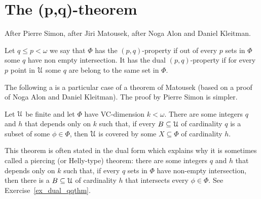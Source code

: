 \documentclass[sputnik.tex]{subfiles}
\begin{document}
\def\vc{{\footnotesize VC}}
\def\nip{{\footnotesize NIP}}


\def\medrel#1{\parbox[t]{6ex}{$\displaystyle\hfil #1$}}
\def\ceq#1#2#3{\parbox[t]{25ex}{$\displaystyle #1$}\medrel{#2}{$\displaystyle #3$}}

\def\mr{\color{brown}}
\def\gr{\color{green}}


\chapter{The (p,q)-theorem}\label{qq}

After Pierre Simon, after Jiri Matousek, after Noga Alon and Daniel Kleitman.

Let $q\le p<\omega$ we say that $\Phi$ has the $(p,q)$-property if out of every $p$ sets in $\Phi$ some $q$ have non empty intersection.
It has the dual $(p,q)$-property if for every $p$ point in $\EuScript U$ some $q$ are belong to the same set in $\Phi$.


The following a is a particular case of a theorem of  Matousek (based on a proof of Noga Alon and Daniel Kleitman).
The proof by Pierre Simon is simpler.

\begin{theorem}\label{thm_qq}
Let $\EuScript U$ be finite and let $\Phi$ have \vc-dimension $k<\omega$.
There are some integers $q$ and $h$ that depends only on $k$ such that, if every $B\subseteq\EuScript U$ of cardinality $q$ is a subset of some $\phi\in\Phi$, then $\EuScript U$ is covered by some $X\subseteq\Phi$ of cardinality $h$.
\end{theorem}

This theorem is often stated in the dual form which explains why it is sometimes called a piercing (or Helly-type) theorem: there are some integers $q$ and $h$ that depends only on $k$ such that, if every $q$ sets in $\Phi$ have non-empty intersection, then there is a $B\subseteq\EuScript U$ of cardinality $h$ that intersects every $\phi\in\Phi$.
See Exercise~\ref{ex_dual_qqthm}.
\end{document}

